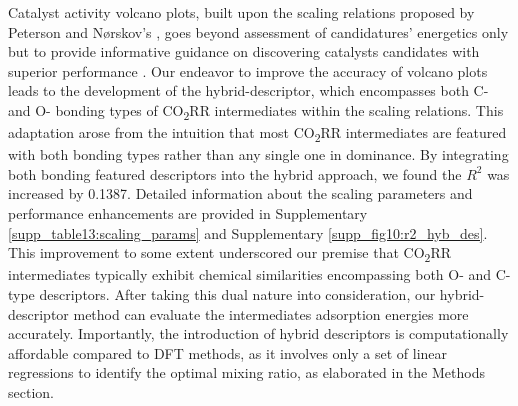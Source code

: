 \documentclass[a4paper, 12pt, titlepage]{article}
\begin{document}
Catalyst activity volcano plots, built upon the scaling relations proposed by Peterson and Nørskov's \cite{peterson2012activity},
goes beyond assessment of candidatures' energetics only but to provide informative guidance on discovering catalysts candidates with superior performance \cite{balandin1969modern, deutschmann2000heterogeneous}.
Our endeavor to improve the accuracy of volcano plots leads to the development of the hybrid-descriptor,
which encompasses both C- and O- bonding types of CO\textsubscript{2}RR intermediates within the scaling relations.
This adaptation arose from the intuition that most CO\textsubscript{2}RR intermediates are featured with both bonding types rather than any single one in dominance.
By integrating both bonding featured descriptors into the hybrid approach, we found the $R^2$ was increased by 0.1387.
Detailed information about the scaling parameters and performance enhancements are provided in Supplementary \cref{supp_table13:scaling_params} and Supplementary \cref{supp_fig10:r2_hyb_des}.
This improvement to some extent underscored our premise that CO\textsubscript{2}RR intermediates typically exhibit chemical similarities encompassing both O- and C-type descriptors.
After taking this dual nature into consideration, our hybrid-descriptor method can evaluate the intermediates adsorption energies more accurately.
Importantly, the introduction of hybrid descriptors is computationally affordable compared to DFT methods,
as it involves only a set of linear regressions to identify the optimal mixing ratio, as elaborated in the Methods section.
\end{document}
